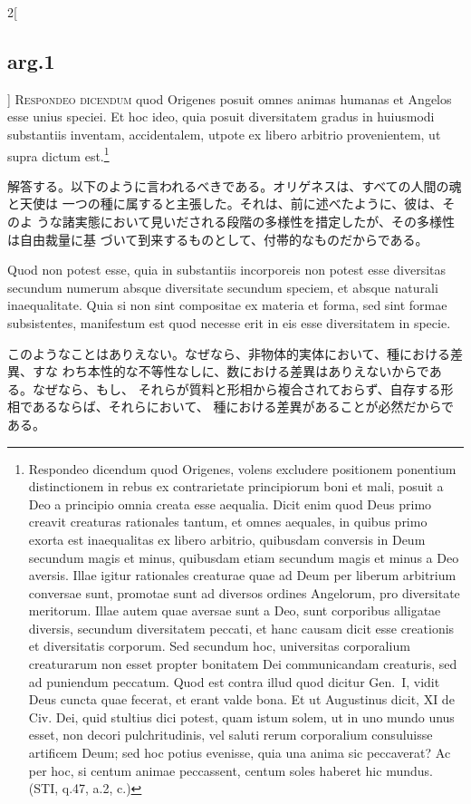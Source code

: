 \documentclass[paper=a4paper,fontsize=10pt,jafontsize=9pt,titlepage]{jlreq}
\begin{document}
\begin{paracol}{2}[\subsection{arg.1}]
{\scshape Respondeo dicendum} quod Origenes posuit omnes animas humanas et
 Angelos esse unius speciei. Et hoc ideo, quia posuit diversitatem gradus in
 huiusmodi substantiis inventam, accidentalem, utpote ex libero arbitrio
 provenientem, ut supra dictum est.\footnote{Respondeo dicendum quod Origenes,
 volens excludere positionem ponentium distinctionem in rebus ex contrarietate
 principiorum boni et mali, posuit a Deo a principio omnia creata esse
 aequalia. Dicit enim quod Deus primo creavit creaturas rationales tantum, et
 omnes aequales, in quibus primo exorta est inaequalitas ex libero arbitrio,
 quibusdam conversis in Deum secundum magis et minus, quibusdam etiam secundum
 magis et minus a Deo aversis. Illae igitur rationales creaturae quae ad Deum
 per liberum arbitrium conversae sunt, promotae sunt ad diversos ordines
 Angelorum, pro diversitate meritorum. Illae autem quae aversae sunt a Deo, sunt
 corporibus alligatae diversis, secundum diversitatem peccati, et hanc causam
 dicit esse creationis et diversitatis corporum. Sed secundum hoc, universitas
 corporalium creaturarum non esset propter bonitatem Dei communicandam
 creaturis, sed ad puniendum peccatum. Quod est contra illud quod dicitur
 Gen.~I, vidit Deus cuncta quae fecerat, et erant valde bona. Et ut Augustinus
 dicit, XI de Civ. Dei, quid stultius dici potest, quam istum solem, ut in uno
 mundo unus esset, non decori pulchritudinis, vel saluti rerum corporalium
 consuluisse artificem Deum; sed hoc potius evenisse, quia una anima sic
 peccaverat? Ac per hoc, si centum animae peccassent, centum soles haberet hic
 mundus. (STI, q.47, a.2, c.)}

\switchcolumn

解答する。以下のように言われるべきである。オリゲネスは、すべての人間の魂と天使は
一つの種に属すると主張した。それは、前に述べたように、彼は、そのよ
うな諸実態において見いだされる段階の多様性を措定したが、その多様性は自由裁量に基
づいて到来するものとして、付帯的なものだからである。

 
\switchcolumn*


Quod non potest esse, quia in substantiis incorporeis non potest esse diversitas
secundum numerum absque diversitate secundum speciem, et absque naturali
inaequalitate. Quia si non sint compositae ex materia et forma, sed sint formae
subsistentes, manifestum est quod necesse erit in eis esse diversitatem in
specie.

\switchcolumn

このようなことはありえない。なぜなら、非物体的実体において、種における差異、すな
わち本性的な不等性なしに、数における差異はありえないからである。なぜなら、もし、
それらが質料と形相から複合されておらず、自存する形相であるならば、それらにおいて、
種における差異があることが必然だからである。
 

\end{paracol}
\end{document}
